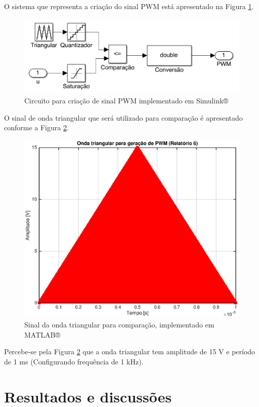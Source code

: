 	 O sistema que representa a criação do sinal PWM está apresentado na Figura \ref{PWM}.
	 
	 \begin{figure}[hbt]
		\centering
  		\includegraphics[scale=.4]{Imagens/Relatorio6/PWM}
  		\caption{Circuito para criação de sinal PWM implementado em Simulink®}
  		\label{PWM}
		\end{figure}
		
		O sinal de onda triangular que será utilizado para comparação é apresentado conforme a Figura \ref{triangular}.
		
		\begin{figure}[hbt]
		\centering
  \includegraphics[scale=.45]{Imagens/relatorio6/triangular_relatorio6}
  \caption{Sinal da onda triangular para comparação, implementado em MATLAB®}
  \label{triangular}
\end{figure}

	Percebe-se pela Figura \ref{triangular} que a onda triangular tem amplitude de 15 V e período de 1 ms (Configurando frequência de 1 kHz). 
	 

\section{Resultados e discussões} 
